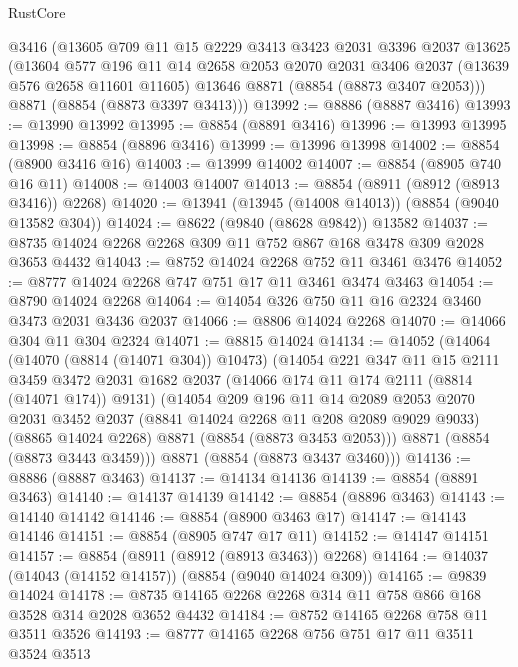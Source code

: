 \begin{lexlean}{RustCore}
\begin{coremodule}
    @3416
    (@13605
      @709
      @11
      @15
      @2229
      @3413
      @3423
      @2031
      @3396
      @2037
      @13625
      (@13604
        @577
        @196
        @11
        @14
        @2658
        @2053
        @2070
        @2031
        @3406
        @2037
        (@13639 @576 @2658 @11601 @11605)
        @13646
        @8871
        (@8854 (@8873 @3407 @2053)))
      @8871
      (@8854 (@8873 @3397 @3413)))
@13992 := @8886 (@8887 @3416)
@13993 := @13990 @13992
@13995 := @8854 (@8891 @3416)
@13996 := @13993 @13995
@13998 := @8854 (@8896 @3416)
@13999 := @13996 @13998
@14002 := @8854 (@8900 @3416 @16)
@14003 := @13999 @14002
@14007 := @8854 (@8905 @740 @16 @11)
@14008 := @14003 @14007
@14013 := @8854 (@8911 (@8912 (@8913 @3416)) @2268)
@14020 := @13941 (@13945 (@14008 @14013)) (@8854 (@9040 @13582 @304))
@14024 := @8622 (@9840 (@8628 @9842)) @13582
@14037 := @8735 @14024 @2268 @2268 @309 @11 @752 @867 @168 @3478 @309 @2028 @3653 @4432
@14043 := @8752 @14024 @2268 @752 @11 @3461 @3476
@14052 := @8777 @14024 @2268 @747 @751 @17 @11 @3461 @3474 @3463
@14054 := @8790 @14024 @2268
@14064 := @14054 @326 @750 @11 @16 @2324 @3460 @3473 @2031 @3436 @2037
@14066 := @8806 @14024 @2268
@14070 := @14066 @304 @11 @304 @2324
@14071 := @8815 @14024
@14134 := @14052
    (@14064
      (@14070 (@8814 (@14071 @304)) @10473)
      (@14054
        @221
        @347
        @11
        @15
        @2111
        @3459
        @3472
        @2031
        @1682
        @2037
        (@14066 @174 @11 @174 @2111 (@8814 (@14071 @174)) @9131)
        (@14054
          @209
          @196
          @11
          @14
          @2089
          @2053
          @2070
          @2031
          @3452
          @2037
          (@8841 @14024 @2268 @11 @208 @2089 @9029 @9033)
          (@8865 @14024 @2268)
          @8871
          (@8854 (@8873 @3453 @2053)))
        @8871
        (@8854 (@8873 @3443 @3459)))
      @8871
      (@8854 (@8873 @3437 @3460)))
@14136 := @8886 (@8887 @3463)
@14137 := @14134 @14136
@14139 := @8854 (@8891 @3463)
@14140 := @14137 @14139
@14142 := @8854 (@8896 @3463)
@14143 := @14140 @14142
@14146 := @8854 (@8900 @3463 @17)
@14147 := @14143 @14146
@14151 := @8854 (@8905 @747 @17 @11)
@14152 := @14147 @14151
@14157 := @8854 (@8911 (@8912 (@8913 @3463)) @2268)
@14164 := @14037 (@14043 (@14152 @14157)) (@8854 (@9040 @14024 @309))
@14165 := @9839 @14024
@14178 := @8735 @14165 @2268 @2268 @314 @11 @758 @866 @168 @3528 @314 @2028 @3652 @4432
@14184 := @8752 @14165 @2268 @758 @11 @3511 @3526
@14193 := @8777 @14165 @2268 @756 @751 @17 @11 @3511 @3524 @3513

\end{coremodule}
\end{lexlean}
